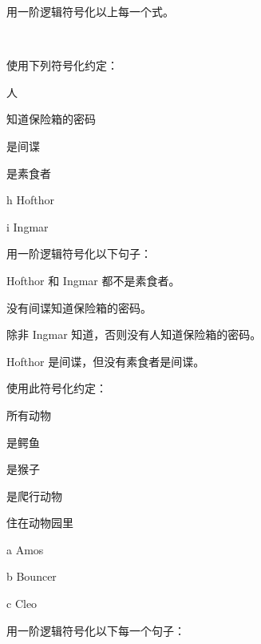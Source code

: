 用一阶逻辑符号化以上每一个式。

\

\problempart
\label{pr.FOLvegetarians}
使用下列符号化约定：

\begin{ekey}
\item[\text{论域}] 人
\item[\atom{K}{x}]  知道保险箱的密码
\item[\atom{S}{x}]  是间谍
\item[\atom{V}{x}]  是素食者
\item[h] Hofthor
\item[i] Ingmar
\end{ekey}

用一阶逻辑符号化以下句子：

\begin{compactlist}
\item Hofthor 和 Ingmar 都不是素食者。
\item 没有间谍知道保险箱的密码。
\item 除非 Ingmar 知道，否则没有人知道保险箱的密码。
\item Hofthor 是间谍，但没有素食者是间谍。
\end{compactlist}

\solutions
\problempart\label{pr.FOLalligators}
使用此符号化约定：

\begin{ekey}
\item[\text{论域}] 所有动物
\item[\atom{A}{x}]  是鳄鱼
\item[\atom{M}{x}]  是猴子
\item[\atom{R}{x}]  是爬行动物
\item[\atom{Z}{x}]  住在动物园里
\item[a] Amos
\item[b] Bouncer
\item[c] Cleo
\end{ekey}

用一阶逻辑符号化以下每一个句子：

